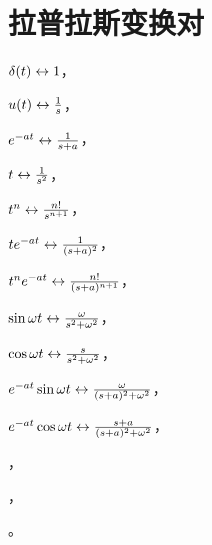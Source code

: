 \documentclass[UTF8]{ctexbook}
\begin{document}
\section{拉普拉斯变换对}
  \begin{tabenum}[(1)] \qquad \qquad
    \item $ \delta(t)\leftrightarrow 1 $，
    \item $ u(t)\leftrightarrow \frac{1}{s} $，
    \item $ e^{-at}\leftrightarrow \frac{1}{s+a} $，\\
    \item $ t\leftrightarrow \frac{1}{s^2} $，
    \item $ t^n\leftrightarrow \frac{n!}{s^{n+1}} $，\\
    \item $ t e^{-at}\leftrightarrow \frac{1}{(s+a)^2} $，
    \item $ t^n e^{-at}\leftrightarrow \frac{n!}{(s+a)^{n+1}} $，\\
    \item $ \sin \omega t\leftrightarrow \frac{\omega}{s^2+\omega^2} $，
    \item $ \cos \omega t\leftrightarrow \frac{s}{s^2+\omega^2} $，\\
    \item $ e^{-at}\sin \omega t\leftrightarrow \frac{\omega}{(s+a)^2+\omega^2} $，
    \item $ e^{-at}\cos \omega t\leftrightarrow \frac{s+a}{(s+a)^2+\omega^2} $，\\
    \item $  $，
    \item $  $，\\
    \item $  $。
  \end{tabenum}


\end{document}
